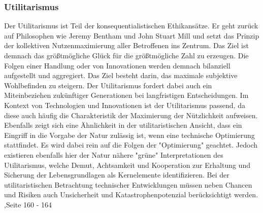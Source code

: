 \subsubsection{Utilitarismus}
Der Utilitarismus ist Teil der konsequentialistischen Ethikansätze. Er geht zurück auf Philosophen wie Jeremy Bentham und John Stuart Mill und setzt das Prinzip der kollektiven Nutzenmaximierung aller Betroffenen ins Zentrum. Das Ziel ist demnach das größtmögliche Glück für die größtmögliche Zahl zu erzeugen. Die Folgen einer Handlung oder von Innovationen werden demnach bilanziell aufgestellt und aggregiert. Das Ziel besteht darin, das maximale subjektive Wohlbefinden zu steigern. Der Utilitarismus fordert dabei auch ein Miteinbeziehen zukünftiger Generationen bei langfristigen Entscheidungen. Im Kontext von Technologien und Innovationen ist der Utilitarismus passend, da diese auch häufig die Charakteristik der Maximierung der Nützlichkeit aufweisen. Ebenfalls zeigt sich eine Ähnlichkeit in der utilitaristischen Ansicht, dass ein Eingriff in die Vorgabe der Natur zulässig ist, wenn eine technische Optimierung stattfindet. Es wird dabei rein auf die Folgen der "Optimierung" geachtet.  Jedoch existieren ebenfalls hier der Natur nähere "grüne"  Interpretationen des Utilitarismus, welche Demut, Achtsamkeit und Kooperation zur Erhaltung und Sicherung der Lebensgrundlagen als Kernelemente identifizieren. Bei der utilitaristischen Betrachtung technischer Entwicklungen müssen neben Chancen und Risiken auch Unsicherheit und Katastrophenpotenzial berücksichtigt werden. \cite{grunwaldHandbuchTechnikethik2021}
,Seite 160 - 164


